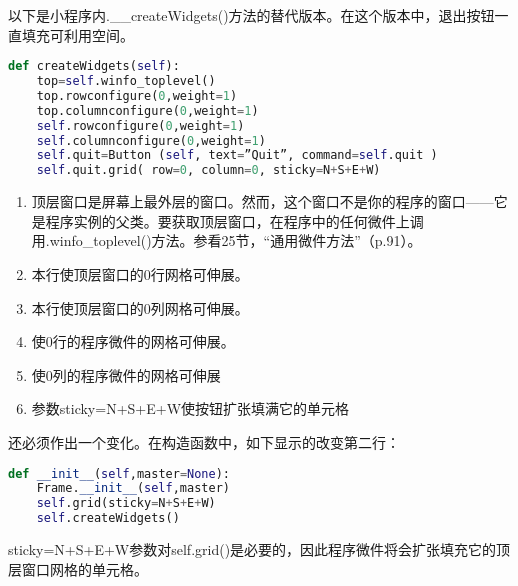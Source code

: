 \documentclass[11pt,a4paper,oneside]{book}
\begin{document}
以下是小程序内.\_\_createWidgets()方法的替代版本。在这个版本中，退出按钮一直填充可利用空间。
\begin{lstlisting}[language=python]
def createWidgets(self):
	top=self.winfo_toplevel()	
	top.rowconfigure(0,weight=1)	   
	top.columnconfigure(0,weight=1)	
	self.rowconfigure(0,weight=1)	
	self.columnconfigure(0,weight=1)	
	self.quit=Button (self, text=”Quit”, command=self.quit )
	self.quit.grid( row=0, column=0, sticky=N+S+E+W)	
\end{lstlisting}
\begin{enumerate}
\item 顶层窗口是屏幕上最外层的窗口。然而，这个窗口不是你的程序的窗口——它是程序实例的父类。要获取顶层窗口，在程序中的任何微件上调用.winfo\_toplevel()方法。参看25节，“通用微件方法”（p.91）。
\item 本行使顶层窗口的0行网格可伸展。 
\item 本行使顶层窗口的0列网格可伸展。
\item 使0行的程序微件的网格可伸展。
\item 使0列的程序微件的网格可伸展
\item 参数sticky=N+S+E+W使按钮扩张填满它的单元格
\end{enumerate}
还必须作出一个变化。在构造函数中，如下显示的改变第二行：
\begin{lstlisting}[language=python]
def __init__(self,master=None):
	Frame.__init__(self,master)
	self.grid(sticky=N+S+E+W)
	self.createWidgets()
\end{lstlisting}
sticky=N+S+E+W参数对self.grid()是必要的，因此程序微件将会扩张填充它的顶层窗口网格的单元格。
\end{document}
